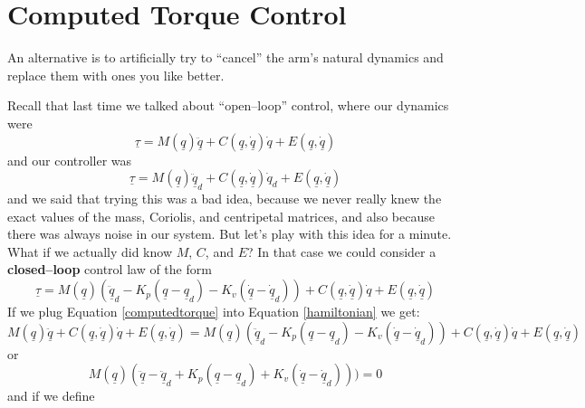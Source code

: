 \documentclass[]{article}
\begin{document}
\section{Computed Torque Control}
An alternative is to artificially try to ``cancel'' the arm's natural dynamics and replace them with ones you like better.

Recall that last time we talked about ``open--loop'' control, where our dynamics were
\begin{displaymath}
 \underline{\tau} = M(\underline{q}) \ddot{\underline{q}} +C(\underline{q}, \underline{\dot{q}})\dot{q} + E(\underline{q}, \underline{\dot{q}})
\end{displaymath}
and our controller was 
\begin{displaymath}
 \underline{\tau} = M(\underline{q}) \ddot{\underline{q}}_{d} +C(\underline{q}, \underline{\dot{q}})\dot{q}_{d} + E(\underline{q}, \underline{\dot{q}})
\end{displaymath}
and we said that trying this was a bad idea, because we never really knew the exact values of the mass, Coriolis, and centripetal matrices, and also because there was always noise in our system. But let's play with this idea for a minute. What if we actually did know $M$, $C$, and $E$? In that case we could consider a \textbf{closed--loop} control law of the form
\begin{equation}
 \underline{\tau} = M(\underline{q})( \ddot{\underline{q}}_{d}- K_{p}(\underline{q} - \underline{q}_{d}) - K_{v}(\underline{\dot{q}} - \underline{\dot{q}}_{d})) +C(\underline{q}, \underline{\dot{q}})\dot{q} + E(\underline{q}, \underline{\dot{q}})  \label{computedtorque}
\end{equation}
If we plug Equation \ref{computedtorque} into Equation \ref{hamiltonian} we get:
\begin{displaymath}
 M(\underline{q}) \ddot{\underline{q}} +C(\underline{q}, \underline{\dot{q}})\dot{q} + E(\underline{q}, \underline{\dot{q}}) =  M(\underline{q})( \ddot{\underline{q}}_{d}- K_{p}(\underline{q} - \underline{q}_{d}) - K_{v}(\underline{\dot{q}} - \underline{\dot{q}}_{d})) +C(\underline{q}, \underline{\dot{q}})\dot{q} + E(\underline{q}, \underline{\dot{q}})
 \end{displaymath}
 or
 \begin{displaymath}
 M(\underline{q})(\ddot{\underline{q}} - \ddot{\underline{q}}_{d} + K_{p}(\underline{q} - \underline{q}_{d})+ K_{v}(\underline{\dot{q}} - \underline{\dot{q}}_{d})))  = 0 
\end{displaymath}
and if we define
\end{document}
